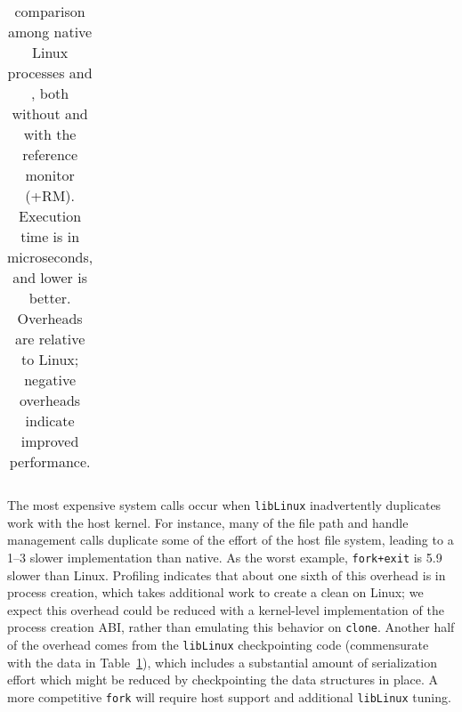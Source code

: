 \begin{table}[t!b!]
\begin{tabular}{|l|rr|rrr|rrr|rrr|}
\end{tabular}
\caption[\lmbench{} benchmarking results in Linux, KVM and \sysname{}]
{\lmbench{} comparison among native Linux processes
and \sysname{} \picoprocs{}, both without and with the reference monitor (+RM).
Execution time is in microseconds, and lower is better. 
Overheads are relative to Linux; negative overheads indicate improved performance. } 
\label{tab:graphene:lmbench}
\end{table}


The most expensive system calls occur when {\tt libLinux} inadvertently duplicates work
with the host kernel.  
For instance, many of the file path and handle management calls duplicate some of the effort of the host file system,
leading to a 1--3\x{} slower implementation than native.
As the worst example,
{\tt fork+exit} is 5.9\x{} slower than Linux.
Profiling indicates that about one sixth of this overhead is in process creation, which 
takes additional work to create a clean \picoproc{} on Linux; we expect this overhead could be reduced
with a kernel-level implementation of the process creation ABI, rather than emulating this behavior on {\tt clone}.
Another half of the overhead comes from the
{\tt libLinux} checkpointing code (commensurate with the data in Table~\ref{tab:graphene:lmbench}), which 
includes a substantial amount of serialization effort which might be reduced by checkpointing the data structures in place.
A more competitive {\tt fork} will require host support and additional {\tt libLinux} tuning.

